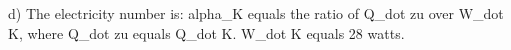 d) The electricity number is:
alpha_K equals the ratio of Q_dot zu over W_dot K, where Q_dot zu equals Q_dot K.
W_dot K equals 28 watts.